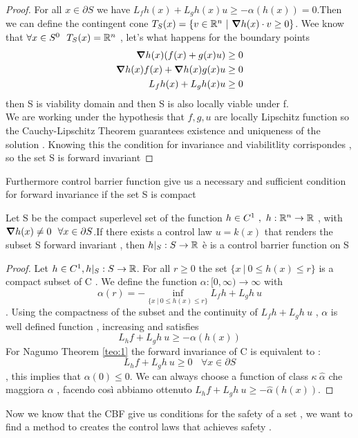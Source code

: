  \begin{proof}
 	For all $x \in \partial S $ we have $L_f h(x) + L_g h(x) u \geq - \alpha (h(x)) = 0 $.Then we can define the contingent cone $T_S(x) = \{v \in \mathbb{R}^n \ | \ \grad{h(x)\cdot v} \geq 0\}$. Wee know that $\forall x \in S^0  \ \ T_S(x)=\mathbb{R}^n$ , let's what happens for the boundary points 
 \begin{align*}
	\grad{h(x)}(f(x)+g(x)u) \geq 0  \\
	\grad{h(x)} f(x) + \grad{h(x)} g(x) u  \geq 0 \\  
L_f h(x) + L_g h(x) u  \geq 0 
 \end{align*}
 then S is  viability domain and then S is also  locally viable under f. \\ 
 We are working under the hypothesis that $ f , g , u$ are locally Lipschitz function so the Cauchy-Lipschitz Theorem guarantees existence and uniqueness of the solution . Knowing this the condition for invariance and viabilitlity corrispondes , so the set S is forward invariant 
 	 \end{proof}
 Furthermore control barrier function give us a necessary and sufficient condition for forward invariance if the set S is compact
 \begin{teo}{}{}
 	Let  S be the compact superlevel set of the function $h \in C^1 \ , \ h : \mathbb{R}^n \rightarrow \mathbb{R}$ , with $\grad{h(x)}\neq 0 \ \ \forall x \in \partial S$.If there exists a control law  $u=k(x)$ that renders the subset S forward invariant , then $h|_S : S \rightarrow \mathbb{R}$ è is a control barrier function on S
 \end{teo}
 \begin{proof}
 	Let $h \in C^1 , h|_S : S \rightarrow \mathbb{R} $. For all  $r \geq  0 $ the set  $\{x \ | \ 0 \leq h(x) \leq r\}$ is a compact subset of  C . We define the function $\alpha : [0 , \infty )\rightarrow \infty $ with 
 	$$\alpha(r) = - \inf_{\{x \ | \ 0 \leq h(x) \leq r\}} L_f h + L_g h \ u $$ . Using the compactness of the subset and the continuity of  $L_f h + L_g h \ u $ , $\alpha$ is  well defined function , increasing  and  satisfies  $$L_hf + L_g h \ u \geq  - \alpha (h(x))$$ For Nagumo Theorem  \ref{teo:1} the forward invariance  of  C is equivalent to : $$L_hf + L_g h \ u \geq   0  \ \ \ \  \forall x \in \partial S $$ , this implies that $\alpha(0) \leq 0$. We can always choose a function of class $\kappa \ \hat{\alpha }$ che maggiora $\alpha$ , facendo così abbiamo ottenuto  $L_hf + L_g h \ u \geq  -\hat { \alpha } (h(x))$.
 \end{proof}
 Now we know that the CBF give us conditions for the safety of a set , we want to find a method to creates the control laws that achieves safety . \\
